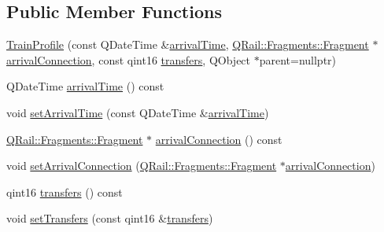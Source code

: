 \subsection*{Public Member Functions}
\begin{DoxyCompactItemize}
\item 
\mbox{\hyperlink{classQRail_1_1RouterEngine_1_1TrainProfile_abe75e954492d6329b4afbcf8b7401cb3}{Train\+Profile}} (const Q\+Date\+Time \&\mbox{\hyperlink{classQRail_1_1RouterEngine_1_1TrainProfile_a73c238e9d780fc388eb7a33d68c1089b}{arrival\+Time}}, \mbox{\hyperlink{classQRail_1_1Fragments_1_1Fragment}{Q\+Rail\+::\+Fragments\+::\+Fragment}} $\ast$\mbox{\hyperlink{classQRail_1_1RouterEngine_1_1TrainProfile_ad1c7f00267cf53ec8f53c9550365eb22}{arrival\+Connection}}, const qint16 \mbox{\hyperlink{classQRail_1_1RouterEngine_1_1TrainProfile_afcbc48797d5b790658f3eaa10f01c860}{transfers}}, Q\+Object $\ast$parent=nullptr)
\item 
Q\+Date\+Time \mbox{\hyperlink{classQRail_1_1RouterEngine_1_1TrainProfile_a73c238e9d780fc388eb7a33d68c1089b}{arrival\+Time}} () const
\item 
void \mbox{\hyperlink{classQRail_1_1RouterEngine_1_1TrainProfile_ad93cc1633f40fc50119be09579544e7f}{set\+Arrival\+Time}} (const Q\+Date\+Time \&\mbox{\hyperlink{classQRail_1_1RouterEngine_1_1TrainProfile_a73c238e9d780fc388eb7a33d68c1089b}{arrival\+Time}})
\item 
\mbox{\hyperlink{classQRail_1_1Fragments_1_1Fragment}{Q\+Rail\+::\+Fragments\+::\+Fragment}} $\ast$ \mbox{\hyperlink{classQRail_1_1RouterEngine_1_1TrainProfile_ad1c7f00267cf53ec8f53c9550365eb22}{arrival\+Connection}} () const
\item 
void \mbox{\hyperlink{classQRail_1_1RouterEngine_1_1TrainProfile_acde86eba727e9108868b650e95d4b239}{set\+Arrival\+Connection}} (\mbox{\hyperlink{classQRail_1_1Fragments_1_1Fragment}{Q\+Rail\+::\+Fragments\+::\+Fragment}} $\ast$\mbox{\hyperlink{classQRail_1_1RouterEngine_1_1TrainProfile_ad1c7f00267cf53ec8f53c9550365eb22}{arrival\+Connection}})
\item 
qint16 \mbox{\hyperlink{classQRail_1_1RouterEngine_1_1TrainProfile_afcbc48797d5b790658f3eaa10f01c860}{transfers}} () const
\item 
void \mbox{\hyperlink{classQRail_1_1RouterEngine_1_1TrainProfile_a37850d0a8872c8fbf9766a6ccf0d696f}{set\+Transfers}} (const qint16 \&\mbox{\hyperlink{classQRail_1_1RouterEngine_1_1TrainProfile_afcbc48797d5b790658f3eaa10f01c860}{transfers}})
\end{DoxyCompactItemize}



